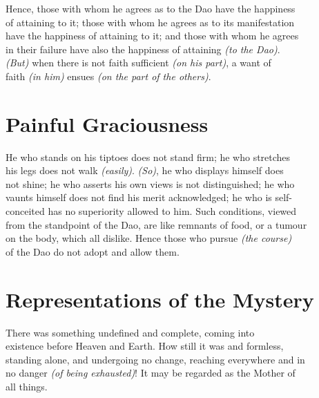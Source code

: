     Hence, those with whom he agrees as to the Dao have the happiness\\
    of attaining to it; those with whom he agrees as to its manifestation\\
    have the happiness of attaining to it; and those with whom he agrees\\
    in their failure have also the happiness of attaining \textit{(to the Dao)}.\\
    \textit{(But)} when there is not faith sufficient \textit{(on his part)}, a want of\\
    faith \textit{(in him)} ensues \textit{(on the part of the others)}.\vspace{\baselineskip}
\newpage{}
\section*{Painful Graciousness}
    He who stands on his tiptoes does not stand firm; he who stretches\\
    his legs does not walk \textit{(easily)}. \textit{(So)}, he who displays himself does\\
    not shine; he who asserts his own views is not distinguished; he who\\
    vaunts himself does not find his merit acknowledged; he who is self-\\
    conceited has no superiority allowed to him. Such conditions, viewed\\
    from the standpoint of the Dao, are like remnants of food, or a tumour\\
    on the body, which all dislike. Hence those who pursue \textit{(the course)}\\
    of the Dao do not adopt and allow them.\vspace{\baselineskip}
    
\section*{Representations of the Mystery}
    There was something undefined and complete, coming into\\
    existence before Heaven and Earth. How still it was and formless,\\
    standing alone, and undergoing no change, reaching everywhere and in\\
    no danger \textit{(of being exhausted)}! It may be regarded as the Mother of\\
    all things.\vspace{\baselineskip}
    
